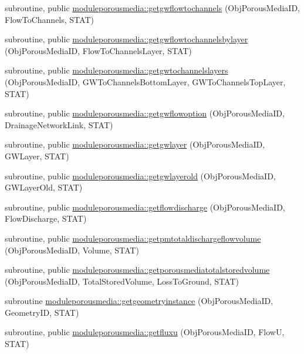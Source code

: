 \begin{DoxyCompactItemize}
\item 
subroutine, public \mbox{\hyperlink{namespacemoduleporousmedia_a59f51d54f2a02220e661022657f0435a}{moduleporousmedia\+::getgwflowtochannels}} (Obj\+Porous\+Media\+ID, Flow\+To\+Channels, S\+T\+AT)
\item 
subroutine, public \mbox{\hyperlink{namespacemoduleporousmedia_a3e1fc1f7f447b7f85698caff9d4810c7}{moduleporousmedia\+::getgwflowtochannelsbylayer}} (Obj\+Porous\+Media\+ID, Flow\+To\+Channels\+Layer, S\+T\+AT)
\item 
subroutine, public \mbox{\hyperlink{namespacemoduleporousmedia_a742d19854f8590b5db164ac97052d8c3}{moduleporousmedia\+::getgwtochannelslayers}} (Obj\+Porous\+Media\+ID, G\+W\+To\+Channels\+Bottom\+Layer, G\+W\+To\+Channels\+Top\+Layer, S\+T\+AT)
\item 
subroutine, public \mbox{\hyperlink{namespacemoduleporousmedia_a959d8f66b0c720fa0d26da43495843eb}{moduleporousmedia\+::getgwflowoption}} (Obj\+Porous\+Media\+ID, Drainage\+Network\+Link, S\+T\+AT)
\item 
subroutine, public \mbox{\hyperlink{namespacemoduleporousmedia_a48f51dadcb6b3234ad3625d8e26cb7bc}{moduleporousmedia\+::getgwlayer}} (Obj\+Porous\+Media\+ID, G\+W\+Layer, S\+T\+AT)
\item 
subroutine, public \mbox{\hyperlink{namespacemoduleporousmedia_aa697c2ff7c0b471220e55d71bd4c665a}{moduleporousmedia\+::getgwlayerold}} (Obj\+Porous\+Media\+ID, G\+W\+Layer\+Old, S\+T\+AT)
\item 
subroutine, public \mbox{\hyperlink{namespacemoduleporousmedia_a26ca2f410bb96e145f78213b45a7a519}{moduleporousmedia\+::getflowdischarge}} (Obj\+Porous\+Media\+ID, Flow\+Discharge, S\+T\+AT)
\item 
subroutine, public \mbox{\hyperlink{namespacemoduleporousmedia_a4ef35ba24ac6cd6fbf310e39c0892c80}{moduleporousmedia\+::getpmtotaldischargeflowvolume}} (Obj\+Porous\+Media\+ID, Volume, S\+T\+AT)
\item 
subroutine, public \mbox{\hyperlink{namespacemoduleporousmedia_a3a5ad5a7ceee985765e313febb118f98}{moduleporousmedia\+::getporousmediatotalstoredvolume}} (Obj\+Porous\+Media\+ID, Total\+Stored\+Volume, Loss\+To\+Ground, S\+T\+AT)
\item 
subroutine \mbox{\hyperlink{namespacemoduleporousmedia_abf74842fd7f071be6dfbcb008ae86d92}{moduleporousmedia\+::getgeometryinstance}} (Obj\+Porous\+Media\+ID, Geometry\+ID, S\+T\+AT)
\item 
subroutine, public \mbox{\hyperlink{namespacemoduleporousmedia_adf0daee2f37be73787378affc272dbc0}{moduleporousmedia\+::getfluxu}} (Obj\+Porous\+Media\+ID, FlowU, S\+T\+AT)

\end{DoxyCompactItemize}
